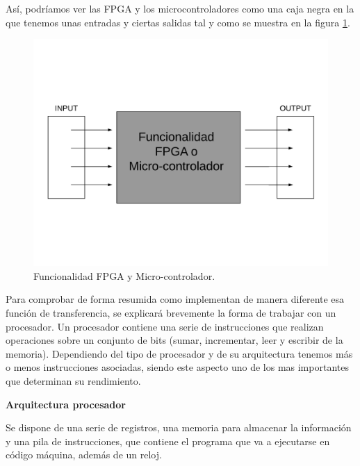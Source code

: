 Así, podríamos ver las FPGA y los microcontroladores como una caja negra en la que tenemos unas entradas y ciertas salidas tal y como se muestra en la figura \ref{fig:funcionalidad_FPGA_micro}.\newline


\begin{figure}[H]
	\center
	\includegraphics[trim = 0mm 30mm 0mm 30mm, clip,scale=0.4]{imagenes/EstadoArte/funcionalidad_FPGA_micro.pdf}
	\caption{Funcionalidad FPGA y Micro-controlador.}
	\label{fig:funcionalidad_FPGA_micro}
\end{figure}

Para comprobar de forma resumida como implementan de manera diferente esa función de transferencia, se explicará brevemente la forma de trabajar con un procesador. \newline
Un procesador contiene una serie de instrucciones que realizan operaciones sobre un conjunto de bits (sumar, incrementar, leer y escribir de la memoria). Dependiendo del tipo de procesador y de su arquitectura tenemos más o menos instrucciones asociadas, siendo este aspecto uno de los mas importantes que determinan su rendimiento.

\textbf{Arquitectura procesador}

Se dispone de una serie de registros, una memoria para almacenar la información y una pila de instrucciones, que contiene el programa que va a ejecutarse en código máquina, además de un reloj.\newline

